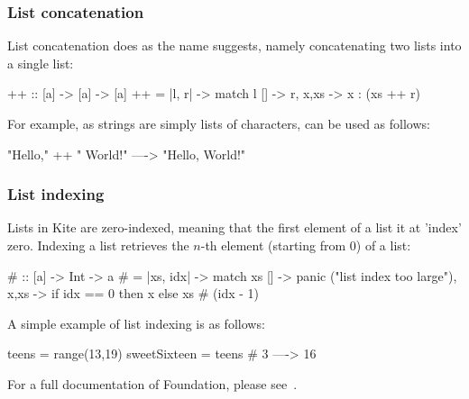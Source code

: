 \subsubsection{List concatenation}
List concatenation does as the name suggests, namely concatenating two lists into a single list:

\begin{kite}
{++} :: [a] -> [a] -> [a]
{++} = |l, r| -> {
  match l {
    [] -> r,
    x,xs -> x : (xs ++ r)
  }
}
\end{kite}

For example, as strings are simply lists of characters, \code{++} can be used as follows:

\begin{kite}
"Hello," ++ " World!" ----> "Hello, World!"
\end{kite}

\subsubsection{List indexing}
Lists in Kite are zero-indexed, meaning that the first element of a list it at 'index' zero. Indexing a list retrieves the $n$-th element (starting from 0) of a list:

\begin{kite}
{#} :: [a] -> Int -> a
{#} = |xs, idx| -> {
  match xs {
    [] -> panic ("list index too large"),
    x,xs -> if idx == 0 then x else xs # (idx - 1)
  }
}
\end{kite}

A simple example of list indexing is as follows:

\begin{kite}
teens = range(13,19)
sweetSixteen = teens # 3 ----> 16
\end{kite}

For a full documentation of Foundation, please see~.